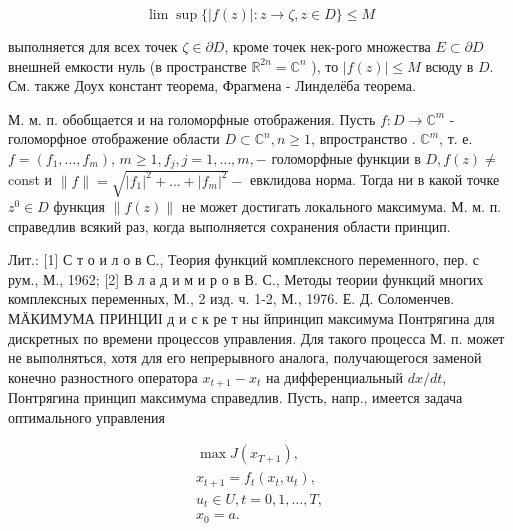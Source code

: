 \documentclass[10pt]{article}
\begin{document}
\[

\lim \sup \{|f(z)|: z \longrightarrow \zeta, z \in D\} \leqslant M

\]



выполняется для всех точек $\zeta \in \partial D$, кроме точек нек-рого множества $E \subset \partial D$ внешней емкости нуль (в пространстве $\mathbb{R}^{2 n}=\mathbb{C}^{n}$ ), то $|f(z)| \leqslant M$ всюду в $D$. См. также Доух констант теорема, Фрагмена - Линделёба теорема.



М. м. п. обобщается и на голоморфные отображения. Пусть $f: D \rightarrow \mathbb{C}^{m}$ - голоморфное отображение области $D \subset \mathbb{C}^{n}, n \geqslant 1$, впространство . $\mathbb{C}^{m}$, т. е. $f=\left(f_{1}, \ldots, f_{m}\right)$, $m \geqslant 1, f_{j}, j=1, \ldots, m,-$ голоморфные функции в $D, f(z) \neq$ const и $\|f\|=\sqrt{\left|f_{1}\right|^{2}+\ldots+\left|f_{m}\right|^{2}}-$ евклидова норма. Тогда ни в какой точке $z^{0} \in D$ функция $\|f(z)\|$ не может достигать локального максимума. М. м. п. справедлив всякий раз, когда выполняется сохранения области принцип.



Лит.: [1] С т о и л о в С., Теория функций комплексного переменного, пер. с рум., М., 1962; [2] В л а д и м и р о в В. С., Методы теории функций многих комплексных переменных, М., 2 изд. ч. 1-2, М., 1976. Е. Д. Соломенчев. МӒКИМУМА ПРИНЦИІ д и с к ре т ны йпринцип максимума Понтрягина для дискретных по времени процессов управления. Для такого процесса М. п. может не выполняться, хотя для его непрерывного аналога, получающегося заменой конечно разностного оператора $x_{t+1}-x_{t}$ на дифференциальный $d x / d t$, Понтрягина принцип максимума справедлив. Пусть, напр., имеется задача оптимального управления



\[

\begin{gathered}

\max J\left(x_{T+1}\right), \\

x_{t+1}=f_{t}\left(x_{t}, u_{t}\right), \\

u_{t} \in U, t=0,1, \ldots, T, \\

x_{0}=a .

\end{gathered}

\]
\end{document}
